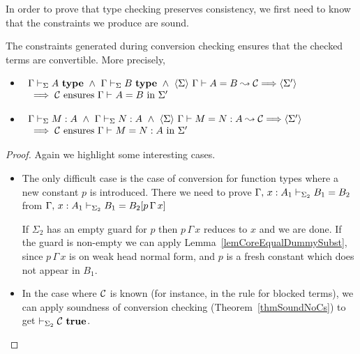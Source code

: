 In order to prove that type checking preserves consistency, we first need to
know that the constraints we produce are sound.

\begin{lemma} \label{lemSoundConstraints}
    The constraints generated during conversion checking ensures that the
    checked terms are convertible.
\if {}
    More precisely,
    \begin{itemize}
	\item \( \begin{array}[t]{l}
		    \IsTypeCS \Sigma \Gamma A
		    ~ \wedge ~ \IsTypeCS \Sigma \Gamma B
		    ~ \wedge ~ \ExplicitJudgement \Sigma {\EqualType A B \Cs} {\Sigma'}
		    \\ {} \implies \mbox{$\Cs$ ensures $\EqualTypeC \Gamma A B$ in $\Sigma'$}
	      \end{array} \)
	\item \( \begin{array}[t]{l}
		    \HasTypeCS \Sigma \Gamma M A
		    ~ \wedge ~ \HasTypeCS \Sigma \Gamma N A
		    ~ \wedge ~ \ExplicitJudgement \Sigma {\Equal M N A \Cs} {\Sigma'}
		    \\ {} \implies \mbox{$\Cs$ ensures $\EqualC \Gamma M N A$ in $\Sigma'$}
	      \end{array} \)
    \end{itemize}
\fi
\end{lemma}

\if {}
\begin{proof}
    Again we highlight some interesting cases.
    \begin{itemize}
	\item 
	
	The only difficult case is the case of conversion for function types
	where a new constant $p$ is introduced. There we need to prove
	$\EqualTypeCS {\Sigma_2} {\Ext \Gamma x : A_1} {B_1} {B_2}$ from
	$\EqualTypeCS {\Sigma_2} {\Ext \Gamma x : A_1} {B_1} {\SubstD {B_2} {p
	\, \Gamma \, x}}$

	If $\Sigma_2$ has an empty guard for $p$ then $p \, \Gamma \, x$
	reduces to $x$ and we are done. If the guard is non-empty we can apply
	Lemma~\ref{lemCoreEqualDummySubst}, since $p \, \Gamma \, x$ is on weak
	head normal form, and $p$ is a fresh constant which does not appear in
	$B_1$.

	\item In the case where $\Cs$ is known (for instance, in the rule for
	blocked terms), we can apply soundness of conversion checking
	(Theorem~\ref{thmSoundNoCs}) to get $\TrueConstr {\Sigma_2} \Cs$.

    \end{itemize}
\end{proof}
\fi

